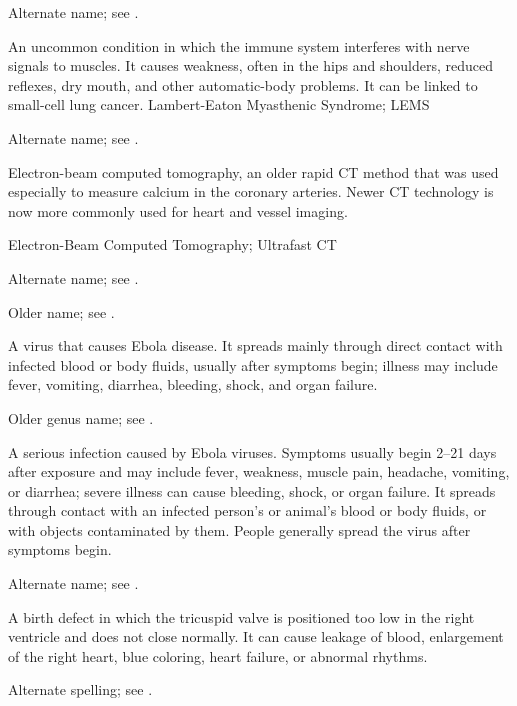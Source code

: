  Alternate name; see .

 An uncommon condition in which the immune system interferes with nerve signals to muscles. It causes weakness, often in the hips and shoulders, reduced reflexes, dry mouth, and other automatic-body problems. It can be linked to small-cell lung cancer.
\synonyms
Lambert-Eaton Myasthenic Syndrome; LEMS

 Alternate name; see .

 Electron-beam computed tomography, an older rapid CT method that was used especially to measure calcium in the coronary arteries. Newer CT technology is now more commonly used for heart and vessel imaging.

\synonyms
Electron-Beam Computed Tomography; Ultrafast CT

 Alternate name; see .

 Older name; see .

 A virus that causes Ebola disease. It spreads mainly through direct contact with infected blood or body fluids, usually after symptoms begin; illness may include fever, vomiting, diarrhea, bleeding, shock, and organ failure.

 Older genus name; see .

 A serious infection caused by Ebola viruses. Symptoms usually begin 2--21 days after exposure and may include fever, weakness, muscle pain, headache, vomiting, or diarrhea; severe illness can cause bleeding, shock, or organ failure. It spreads through contact with an infected person’s or animal’s blood or body fluids, or with objects contaminated by them. People generally spread the virus after symptoms begin.

 Alternate name; see .

 A birth defect in which the tricuspid valve is positioned too low in the right ventricle and does not close normally. It can cause leakage of blood, enlargement of the right heart, blue coloring, heart failure, or abnormal rhythms.

 Alternate spelling; see .

